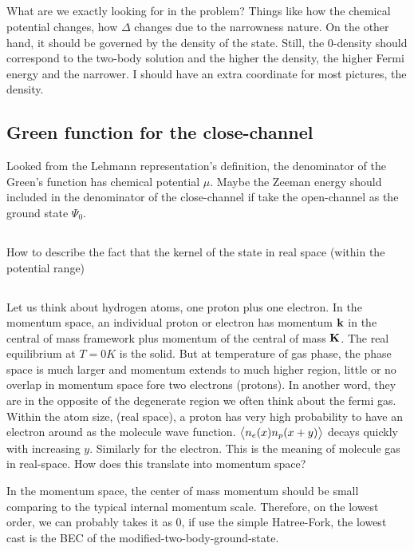 \subsection{}
What are we exactly looking for in the problem? Things like how the chemical potential changes, how $\Delta$ changes due to the narrowness nature.  On the other hand, it should be governed by the density of the state.  Still, the 0-density should correspond to the two-body solution and the higher the density, the higher Fermi energy and the narrower.  I should have an extra coordinate for most pictures, the density.  

\subsection{Green function for the close-channel}
Looked from the Lehmann representation's definition,  the denominator of the Green's function has chemical potential $\mu$. Maybe the Zeeman energy should included in the denominator of the close-channel if take the open-channel as the ground state $\Psi_{0}$.  

\subsection{}
How to describe the fact that the kernel of the state in real space (within the potential range) 

\subsection{}
Let us think about hydrogen atoms, one proton plus one electron.  In the momentum space, an individual proton or electron has momentum $\mathbf{k}$ in the central of mass framework plus momentum of the central of mass  $\mathbf{K}$.  The real equilibrium at $T=0K$ is the solid.  But at temperature of  gas phase, the phase space is much larger and momentum extends to much higher region, little or no overlap in momentum space fore two electrons (protons).  In another word, they are in the opposite of the degenerate region we often think about the fermi gas.  Within the atom size, (real space), a proton has very high probability to have an electron around as the molecule wave function.  $\bigl<{n_{e}(x)n_{p}(x+y)}\bigr>$ decays quickly with increasing $y$.  Similarly for the electron.  This is the meaning of molecule gas in real-space.  How does this translate into momentum space? 

In the momentum space, the center of mass momentum should be small comparing to the typical internal momentum scale.  Therefore, on the lowest order, we can probably takes it as 0, if use the simple Hatree-Fork, the lowest cast is the BEC of the modified-two-body-ground-state. 	


